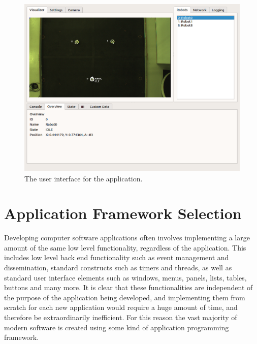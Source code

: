 \begin{figure}
	\centering
	\includegraphics[scale=0.4]{Figures/ApplicationScreenshotOverview.png}
	\decoRule
	\caption[Application User Interface]{The user interface for the application.}
	\label{fig:UI}
\end{figure}

\section{Application Framework Selection}
Developing computer software applications often involves implementing a large amount of the same low level functionality, regardless of the application. This includes low level back end functionality such as event management and dissemination, standard constructs such as timers and threads, as well as standard user interface elements such as windows, menus, panels, lists, tables, buttons and many more. It is clear that these functionalities are independent of the purpose of the application being developed, and implementing them from scratch for each new application would require a huge amount of time, and therefore be extraordinarily inefficient. For this reason the vast majority of modern software is created using some kind of application programming framework.

